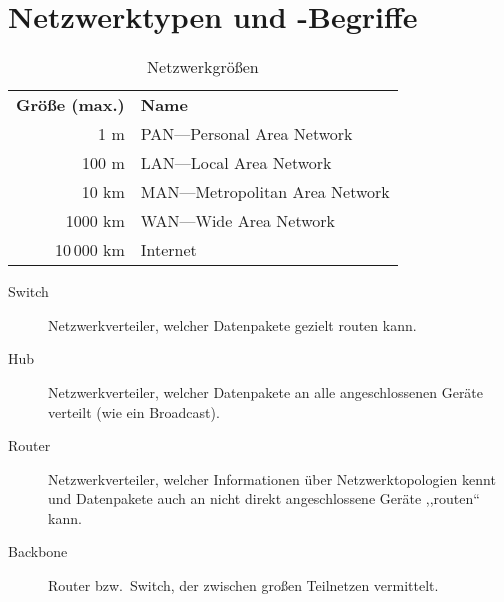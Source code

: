 




\chapter{Netzwerktypen und -Begriffe}

\begin{table}[h]
\centering
\begin{tabular}{rl}
\bfseries Größe (max.) & \bfseries Name \\
1 m & PAN---Personal Area Network \\
100 m & LAN---Local Area Network \\
10 km & MAN---Metropolitan Area Network \\
1000 km & WAN---Wide Area Network \\
10\,000 km & Internet
\end{tabular}
\caption{Netzwerkgrößen}
\end{table}

\begin{description}
\item [{Switch}] Netzwerkverteiler, welcher Datenpakete gezielt routen kann.
\item [{Hub}] Netzwerkverteiler, welcher Datenpakete an alle an\-ge\-schloss\-en\-en Geräte verteilt (wie ein Broadcast).
\item [{Router}] Netzwerkverteiler, welcher Informationen über Netzwerktopologien kennt und Datenpakete auch an nicht direkt angeschlossene Geräte ,,routen`` kann.
\item [{Backbone}] Router bzw.~Switch, der zwischen großen Teilnetzen vermittelt.
\end{description}

